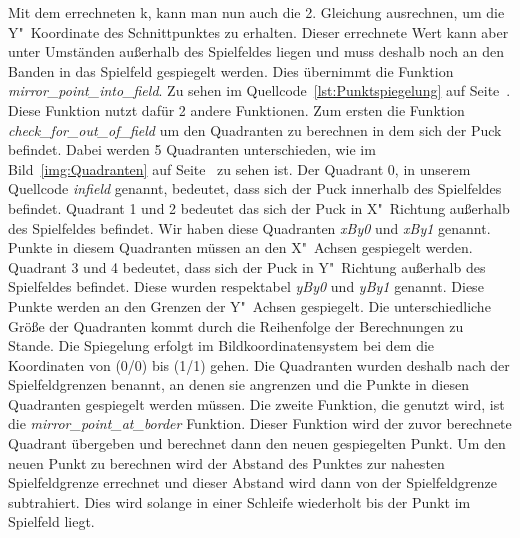 Mit dem errechneten k, kann man nun auch die 2. Gleichung ausrechnen, um die Y"~Koordinate des Schnittpunktes zu erhalten. Dieser errechnete Wert kann aber unter Umständen außerhalb des Spielfeldes liegen und muss deshalb noch an den Banden in das Spielfeld gespiegelt werden. Dies übernimmt die Funktion \textit{mirror\_point\_into\_field}. Zu sehen im Quellcode~\ref{lst:Punktspiegelung} auf Seite~\pageref{lst:Punktspiegelung}. Diese Funktion nutzt dafür 2 andere Funktionen. Zum ersten die Funktion \textit{check\_for\_out\_of\_field} um den Quadranten zu berechnen in dem sich der Puck befindet. Dabei werden 5 Quadranten unterschieden, wie im Bild~\ref{img:Quadranten} auf Seite~\pageref{img:Quadranten} zu sehen ist. Der Quadrant 0, in unserem Quellcode \textit{infield} genannt, bedeutet, dass sich der Puck innerhalb des Spielfeldes befindet. Quadrant 1 und 2 bedeutet das sich der Puck in X"~Richtung außerhalb des Spielfeldes befindet. Wir haben diese Quadranten \textit{xBy0} und \textit{xBy1} genannt. Punkte in diesem Quadranten müssen an den X"~Achsen gespiegelt werden. Quadrant 3 und 4 bedeutet, dass sich der Puck in Y"~Richtung außerhalb des Spielfeldes befindet. Diese wurden respektabel \textit{yBy0} und \textit{yBy1} genannt. Diese Punkte werden an den Grenzen der Y"~Achsen gespiegelt. Die unterschiedliche Größe der Quadranten kommt durch die Reihenfolge der Berechnungen zu Stande. Die Spiegelung erfolgt im Bildkoordinatensystem bei dem die Koordinaten von (0/0) bis (1/1) gehen. Die Quadranten wurden deshalb nach der Spielfeldgrenzen benannt, an denen sie angrenzen und die Punkte in diesen Quadranten gespiegelt werden müssen.
Die zweite Funktion, die genutzt wird, ist die \textit{mirror\_point\_at\_border} Funktion. Dieser Funktion wird der zuvor berechnete Quadrant übergeben und berechnet dann den neuen gespiegelten Punkt. Um den neuen Punkt zu berechnen wird der Abstand des Punktes zur nahesten Spielfeldgrenze errechnet und dieser Abstand wird dann von der Spielfeldgrenze subtrahiert. Dies wird solange in einer Schleife wiederholt bis der Punkt im Spielfeld liegt.
